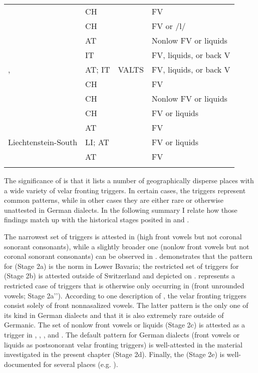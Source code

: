 \begin{table}
\begin{tabularx}{\textwidth}{Q@{~}llQ}
 & CH & \citet{Gröger1914d} & FV\\
 & CH & \citet{Gröger1914e} & FV or /l/\\
 & AT & \citet{Egger1909} & Nonlow FV or liquids\\
 & IT & \citet{Insam1936} & FV, liquids, or back V\\
,  & AT; IT & VALTS & FV, liquids, or back V\\
 & CH & \citet{Vetsch1910} & FV\\
 & CH & \citet{Berger1913} & Nonlow FV or liquids\\
 & CH & \citet{Meinherz1920} & FV or liquids\\
 & AT & \citet{Jutz1922} & FV\\
Liechtenstein-South  & LI; AT & \citet{Jutz1925} & FV or liquids\\
 & AT & \citet{BethgeBonnin1969}  & FV\\
\lspbottomrule
\end{tabularx}
\end{table}


The significance of  is that it lists a number of geographically disperse places with a wide variety of velar fronting triggers. In certain cases, the triggers represent common patterns, while in other cases they are either rare or otherwise unattested in German dialects. In the following summary I relate how those findings match up with the historical stages posited in  and .\largerpage

The narrowest set of triggers is attested in  (high front vowels but not coronal sonorant consonants), while a slightly broader one (nonlow front vowels but not coronal sonorant consonants) can be observed in  .  demonstrates that the pattern for  (Stage 2a) is the norm in Lower Bavaria; the restricted set of triggers for  (Stage 2b) is attested outside of Switzerland and depicted on .  represents a restricted case of triggers that is otherwise only occurring in  (front unrounded vowels; Stage 2a'{}'). According to one description of , the velar fronting triggers consist solely of front nonnasalized vowels. The latter pattern is the only one of its kind in German dialects and that it is also extremely rare outside of Germanic. The set of nonlow front vowels or liquids (Stage 2c) is attested as a trigger in , , , and . The default pattern for German dialects (front vowels or liquids as postsonorant velar fronting triggers) is well-attested in the material investigated in the present chapter (Stage 2d). Finally, the  (Stage 2e) is well-documented for several places (e.g. ).

